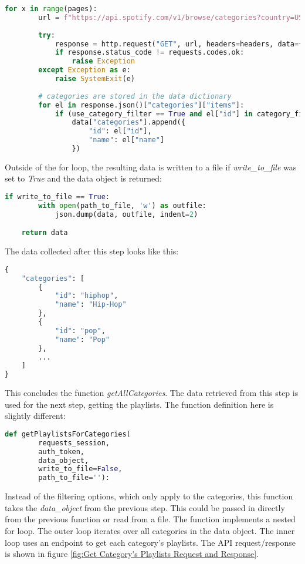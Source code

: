 \begin{lstlisting}[language=Python]
    for x in range(pages):
        url = f"https://api.spotify.com/v1/browse/categories?country=US&locale=en_US&limit=50&offset={x * 50}"
        
        try:
            response = http.request("GET", url, headers=headers, data={})
            if response.status_code != requests.codes.ok:
                raise Exception
        except Exception as e:
            raise SystemExit(e)
        
        # categories are stored in the data dictionary
        for el in response.json()["categories"]["items"]:
            if (use_category_filter == True and el["id"] in category_filter) or use_category_filter == False:
                data["categories"].append({
                    "id": el["id"], 
                    "name": el["name"]
                })
\end{lstlisting}

Outside of the for loop, the resulting data is written to a file if \emph{write\_to\_file} was set to \emph{True} and the 
data object is returned:


\begin{lstlisting}[language=Python]
    if write_to_file == True:
        with open(path_to_file, 'w') as outfile:
            json.dump(data, outfile, indent=2)

    return data
\end{lstlisting}

The data collected after this step looks like this:

\begin{lstlisting}[language=Python]
{
    "categories": [
        {
            "id": "hiphop",
            "name": "Hip-Hop"
        },
        {
            "id": "pop",
            "name": "Pop"
        },
        ...
    ]
}
\end{lstlisting}

This concludes the function \emph{getAllCategories}.
The data retrieved from this step is used for the next step, getting the playlists.
The function definition here is slightly different:

\begin{lstlisting}[language=Python]
    def getPlaylistsForCategories(
        requests_session,
        auth_token,
        data_object,
        write_to_file=False,
        path_to_file=''):
\end{lstlisting}

Instead of the filtering options, which only apply to the categories, this function takes the \emph{data\_object} from the
previous step. This could be passed in directly from the previous function or read from a file.
The function implements a nested for loop. The outer loop iterates over all categories in the data object.
The inner loop uses an endpoint to get each category's playlists. The API request/response is shown in figure \ref{fig:Get Category's Playlists Request and Response}.

